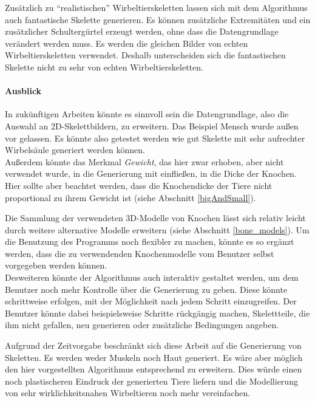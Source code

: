 Zusätzlich zu "`realistischen"' Wirbeltierskeletten lassen sich mit dem Algorithmus auch fantastische Skelette generieren. Es können zusätzliche Extremitäten und ein zusätzlicher Schultergürtel erzeugt werden, ohne dass die Datengrundlage verändert werden muss. Es werden die gleichen Bilder von echten Wirbeltierskeletten verwendet.
Deshalb unterscheiden sich die fantastischen Skelette nicht zu sehr von echten Wirbeltierskeletten.  


\paragraph{Ausblick}

In zukünftigen Arbeiten könnte es sinnvoll sein die Datengrundlage, also die Auswahl an 2D-Skelettbildern, zu erweitern. Das Beispiel Mensch wurde \zb außen vor gelassen. Es könnte also getestet werden wie gut Skelette mit sehr aufrechter Wirbelsäule generiert werden können.\\
Außerdem könnte das Merkmal \emph{Gewicht}, das hier zwar erhoben, aber nicht verwendet wurde, in die Generierung mit einfließen, \zb in die Dicke der Knochen. Hier sollte aber beachtet werden, dass die Knochendicke der Tiere nicht proportional zu ihrem Gewicht ist (siehe Abschnitt \ref{bigAndSmall}).

Die Sammlung der verwendeten 3D-Modelle von Knochen lässt sich relativ leicht durch weitere \bzw alternative Modelle erweitern (siehe Abschnitt \ref{bone_models}). Um die Benutzung des Programms noch flexibler zu machen, könnte es so ergänzt werden, dass die zu verwendenden Knochenmodelle vom Benutzer selbst vorgegeben werden können.\\
Desweiteren könnte der Algorithmus auch interaktiv gestaltet werden, um dem Benutzer noch mehr Kontrolle über die Generierung zu geben. Diese könnte \zb schrittweise erfolgen, mit der Möglichkeit nach jedem Schritt einzugreifen. Der Benutzer könnte dabei beispielsweise Schritte rückgängig machen, Skelettteile, die ihm nicht gefallen, neu generieren oder zusätzliche Bedingungen angeben.

Aufgrund der Zeitvorgabe beschränkt sich diese Arbeit auf die Generierung von Skeletten. Es werden weder Muskeln noch Haut generiert. Es wäre aber möglich den hier vorgestellten Algorithmus entsprechend zu erweitern. Dies würde einen noch plastischeren Eindruck der generierten Tiere liefern und die Modellierung von sehr wirklichkeitsnahen Wirbeltieren noch mehr vereinfachen.


